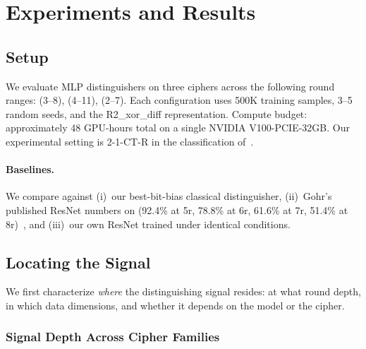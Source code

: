 \section{Experiments and Results}
\label{sec:experiments}

\FloatBarrier
\subsection{Setup}

We evaluate MLP distinguishers on three ciphers across the following round ranges: \speck (3--8), \simon (4--11), \present (2--7).
Each configuration uses 500K training samples, 3--5 random seeds, and the R2\_xor\_diff representation.
Compute budget: approximately 48 GPU-hours total on a single NVIDIA V100-PCIE-32GB.
Our experimental setting is 2-1-CT-R in the classification of~\citet{bellini2023dbitnet,gerault2024sok}.

\paragraph{Baselines.}
We compare against (i)~our best-bit-bias classical distinguisher, (ii)~Gohr's published ResNet numbers on \speck (92.4\% at 5r, 78.8\% at 6r, 61.6\% at 7r, 51.4\% at 8r)~\citep{gohr2019}, and (iii)~our own ResNet trained under identical conditions.


\FloatBarrier
\subsection{Locating the Signal}
\label{sec:exp-representation}

We first characterize \emph{where} the distinguishing signal resides: at what round depth, in which data dimensions, and whether it depends on the model or the cipher.

\FloatBarrier
\subsubsection{Signal Depth Across Cipher Families}
\label{sec:exp-vulnerability}

